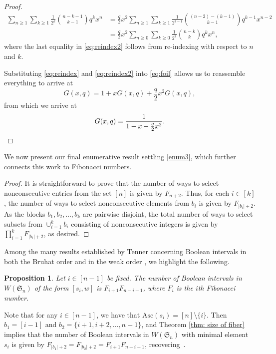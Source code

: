 \documentclass[11pt,reqno]{amsart}
\newcommand{\Asc}{\mathrm{Asc}}
\newtheorem{proposition}{Proposition}[section]
\theoremstyle{definition}
\theoremstyle{notation}
\theoremstyle{openproblem}
\newcommand{\Sym}{\mathfrak{S}}
\begin{document}
\begin{proof}
    \begin{align} 
    \sum_{n\geq 1} \sum_{k\geq 1} \frac{1}{2^k} \binom{n-k-1}{k-1} q^kx^n &= \frac{q}{2}x^{2} \sum_{n\geq 1} \sum_{k\geq 1} \frac{1}{2^{k-1}} \binom{(n-2) -(k-1)}{k-1} q^{k-1}x^{n-2}\nonumber\\
    &= \frac{q}{2}x^{2} \sum_{n\geq 0} \sum_{k\geq 0} \frac{1}{2^{k}} \binom{n-k}{k} q^{k}x^{n},\label{eq:reindex2}
    \end{align}
    where the last equality in \eqref{eq:reindex2} follows from re-indexing with respect to $n$ and $k$.

    Substituting \eqref{eq:reindex} and \eqref{eq:reindex2} into \eqref{eq:foil} allows us to reassemble everything to arrive at
    \[
    G(x,q) = 1+xG(x,q) + \frac{q}{2}x^{2}G(x,q),
    \]
    from which we arrive at
    \[
    G(x,q) = \frac{1}{1-x-\frac{q}{2}x^2}.\qedhere
    \]
\end{proof}

We now present our final enumerative result settling  \eqref{enum3}, which further connects this work to Fibonacci numbers.


\sizeOfFiberThm*

\begin{proof}
It is straightforward to prove that the number of ways to select nonconsecutive entries from the set $[n]$ is given by $F_{n+2}$. 
Thus, for each $i\in[k]$, the number of ways to select nonconsecutive elements from $b_i$ is given by $F_{|b_i|+2}$. As the blocks $b_1,b_2,\ldots,b_k$ are pairwise disjoint, the total number of ways to select subsets from $\cup_{i=1}^k b_i$ consisting of nonconsecutive integers is given by $\prod_{i=1}^k F_{|b_i|+2}$, as desired.
\end{proof}

Among the many results established by Tenner concerning Boolean intervals in both the Bruhat order and in the weak order \cite{Tenner_Intervals}, we highlight the following.

\begin{proposition}{\cite[Proposition 5.9]{Tenner_Intervals}}
     Let $i\in [n-1]$ be fixed. The number of Boolean intervals in $W(\Sym_n)$ of the form $[s_i, w]$ is $F_{i+1}F_{n-i+1}$, where $F_i$ is the $i$th Fibonacci number.
    \end{proposition}

Note that for any $i\in[n-1]$, we have that $\Asc(s_i)=[n]\setminus\{i\}$. 
Then $b_1=[i-1]$ and $b_2=\{i+1,i+2,\ldots, n-1\}$, and Theorem \ref{thm: size of fiber} implies that the number of Boolean intervals in $W(\Sym_n)$ with minimal element $s_i$ is given by $F_{|b_1|+2}=F_{|b_2|+2}=F_{i+1}F_{n-i+1}$, recovering~\cite[Proposition 5.9]{Tenner_Intervals}.
\end{document}
